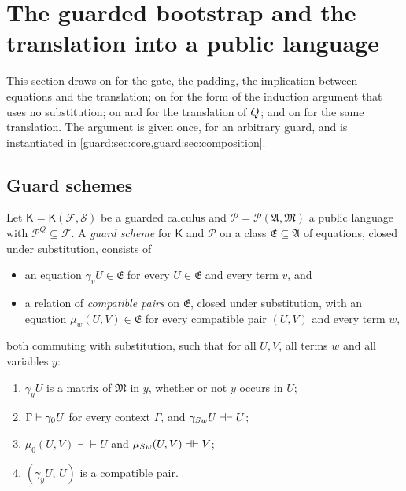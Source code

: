 \section{The guarded bootstrap and the translation into a public language}
\label{guard:sec:bootstrap}

This section draws on  for the gate, the padding, the
implication between equations and the translation; on 
for the form of the induction argument that uses no substitution; on
 and  for the translation of
$Q_{}$; and on  for the same translation.  The
argument is given once, for an arbitrary guard, and is instantiated in
\cref{guard:sec:core,guard:sec:composition}.

\subsection{Guard schemes}

\begin{definition}
\label{guard:def:scheme}
Let $\mathsf K=\mathsf K(\mathcal F,\mathcal S)$ be a guarded calculus and
$\mathcal P=\mathcal P(\mathfrak A,\mathfrak M)$ a public language with
$\mathcal P^{Q}\subseteq\mathcal F$.  A \emph{guard scheme} for
$\mathsf K$ and $\mathcal P$ on a class $\mathfrak E\subseteq\mathfrak A$ of
equations, closed under substitution, consists of
\begin{itemize}
\item an equation $\gamma_vU\in\mathfrak E$ for every $U\in\mathfrak E$ and
 every term $v$, and
\item a relation of \emph{compatible pairs} on $\mathfrak E$, closed under
 substitution, with an equation $\mu_w(U,V)\in\mathfrak E$ for every
 compatible pair $(U,V)$ and every term $w$,
\end{itemize}
both commuting with substitution, such that for all $U,V$, all terms $w$
and all variables $y$:
\begin{enumerate}[label=\textup{(G\arabic*)}]
\item $\gamma_yU$ is a matrix of $\mathfrak M$ in $y$, whether or not $y$
 occurs in $U$;
\item $\Gamma\vdash\gamma_0U$ for every context $\Gamma$, and
 $\gamma_{S w}U\dashv\vdash U$;
\item $\mu_0(U,V)\dashv\vdash U$ and $\mu_{S w}(U,V)\dashv\vdash V$;
\item $(\gamma_yU,\,U)$ is a compatible pair.
\end{enumerate}
\end{definition}

